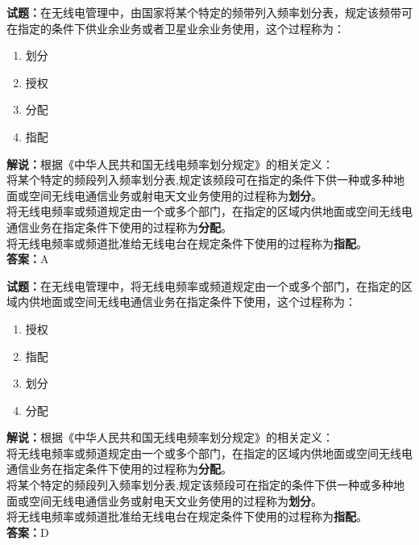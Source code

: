 \documentclass{ctexbook}
\begin{document}
\bigskip

\noindent\textbf{试题：}在无线电管理中，由国家将某个特定的频带列入频率划分表，规定该频带可在指定的条件下供业余业务或者卫星业余业务使用，这个过程称为：
\begin{enumerate}[leftmargin=3em]
  \item 划分
  \item 授权
  \item 分配
  \item 指配
\end{enumerate}
\noindent\textbf{解说：}根据《中华人民共和国无线电频率划分规定》的相关定义：\\将某个特定的频段列入频率划分表,规定该频段可在指定的条件下供一种或多种地面或空间无线电通信业务或射电天文业务使用的过程称为\textbf{划分}。\\将无线电频率或频道规定由一个或多个部门，在指定的区域内供地面或空间无线电通信业务在指定条件下使用的过程称为\textbf{分配}。\\将无线电频率或频道批准给无线电台在规定条件下使用的过程称为\textbf{指配}。\\
\textbf{答案：}A

\bigskip

\noindent\textbf{试题：}在无线电管理中，将无线电频率或频道规定由一个或多个部门，在指定的区域内供地面或空间无线电通信业务在指定条件下使用，这个过程称为：
\begin{enumerate}[leftmargin=3em]
  \item 授权
  \item 指配
  \item 划分
  \item 分配
\end{enumerate}
\noindent\textbf{解说：}根据《中华人民共和国无线电频率划分规定》的相关定义：\\将无线电频率或频道规定由一个或多个部门，在指定的区域内供地面或空间无线电通信业务在指定条件下使用的过程称为\textbf{分配}。\\将某个特定的频段列入频率划分表,规定该频段可在指定的条件下供一种或多种地面或空间无线电通信业务或射电天文业务使用的过程称为\textbf{划分}。\\将无线电频率或频道批准给无线电台在规定条件下使用的过程称为\textbf{指配}。\\
\textbf{答案：}D

\bigskip
\end{document}
